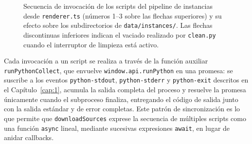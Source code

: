 \begin{figure}[htbp]
\caption{Secuencia de invocaci\'on de los scripts del pipeline de instancias
desde \texttt{renderer.ts} (n\'umeros 1--3 sobre las flechas superiores) y su
efecto sobre los subdirectorios de \texttt{data/instances/}. Las flechas
discontinuas inferiores indican el vaciado realizado por \texttt{clean.py}
cuando el interruptor de limpieza est\'a activo.}
\label{fig:cap3-flujo}
\end{figure}

Cada invocaci\'on a un script se realiza a trav\'es de la funci\'on auxiliar
\texttt{runPythonCollect}, que envuelve \texttt{window.api.runPython} en
una promesa: se suscribe a los eventos \texttt{python-stdout},
\texttt{python-stderr} y \texttt{python-exit} descritos en el
Cap\'itulo~\ref{cap:1}, acumula la salida completa del proceso y resuelve
la promesa \'unicamente cuando el subproceso finaliza, entregando el
c\'odigo de salida junto con la salida est\'andar y de error completas. Este
patr\'on de sincronizaci\'on es lo que permite que \texttt{downloadSources}
exprese la secuencia de m\'ultiples scripts como una funci\'on
\texttt{async} lineal, mediante sucesivas expresiones \texttt{await}, en
lugar de anidar callbacks.
